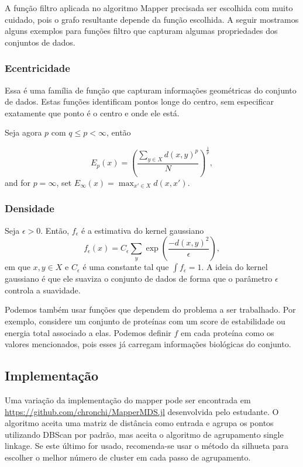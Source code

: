 A função filtro aplicada no algoritmo Mapper precisada ser escolhida com muito cuidado, pois o
grafo resultante depende da função escolhida. A seguir mostramos alguns exemplos para funções
filtro que capturam algumas propriedades dos conjuntos de dados.

\subsubsection{Ecentricidade}

Essa é uma família de função que capturam informações geométricas do conjunto de dados. Estas funções
identificam pontos longe do centro, sem especificar exatamente que ponto é o centro e onde ele está. 

Seja agora $p$ com $q \leq p < \infty$, então

\begin{equation}
    E_p(x) = \left( \frac{\sum_{y\in X} d(x,y)^p}{N} \right)^{\frac{1}{p}},
\end{equation}
and for $p = \infty$, set $E_\infty(x) = \max_{x' \in X} d(x,x')$. 

\subsubsection{Densidade} 

Seja $\epsilon > 0$. Então, $f_\epsilon$ é a estimativa do kernel gaussiano  
\begin{equation}
    f_\epsilon (x) = C_\epsilon \sum_y \exp\left( \frac{-d(x,y)^2}{\epsilon}\right),
\end{equation}
em que $x,y \in X$ e $C_\epsilon$ é uma constante tal que $\int f_\epsilon = 1$. A ideia 
do kernel gaussiano é que ele suaviza o conjunto de dados de forma que o parâmetro $\epsilon$ 
controla a suavidade. 

Podemos também usar funções que dependem do problema a ser trabalhado. Por exemplo, considere
um conjunto de proteínas com um score de estabilidade ou energia total associado a elas. Podemos
definir $f$ em cada proteína como os valores mencionados, pois esses já carregam informações
biológicas do conjunto. 

\subsection{Implementação} 

Uma variação da implementação do mapper pode ser encontrada em \url{https://github.com/chronchi/MapperMDS.jl}
desenvolvida pelo estudante. O algoritmo aceita uma matriz de distância como entrada e agrupa os pontos
utilizando DBScan \cite{Ester96} por padrão, mas aceita o algoritmo de agrupamento single linkage. 
Se este último for usado, recomenda-se usar o método da silhueta \cite{Rousseeuw1987} para escolher 
o melhor número de cluster em cada passo de agrupamento. 
